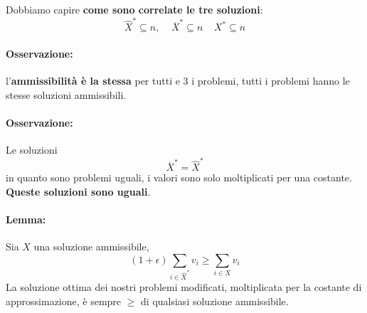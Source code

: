 \newpage

Dobbiamo capire \textbf{come sono correlate le tre soluzioni}:
$$ \hat X^\ast \subseteq n, \;\;\;\; \overline X^\ast \subseteq n \;\;\;\; X^\ast \subseteq n$$

\paragraph{Osservazione:} l'\textbf{ammissibilità è la stessa} per tutti e 3 i problemi, tutti i problemi hanno le stesse soluzioni ammissibili.\\

\paragraph{Osservazione:} Le soluzioni 
$$ \overline X^\ast = \hat X^\ast$$
in quanto sono problemi uguali, i valori sono solo moltiplicati per una costante. \textbf{Queste soluzioni sono uguali}.\\

\paragraph{Lemma:} Sia $X$ una soluzione ammissibile, 
$$ (1 + \epsilon) \sum_{i \in \hat X^\ast} v_i \geq \sum_{i \in X} v_i $$
La soluzione ottima dei nostri problemi modificati, moltiplicata per la costante di approssimazione, è sempre $\geq$ di qualsiasi soluzione ammissibile.\\

